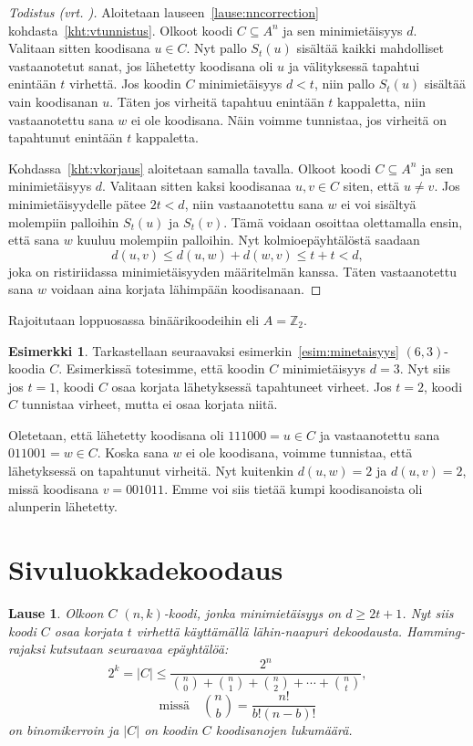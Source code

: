 \documentclass[a4paper,12pt,leqno,oneside]{report} %
\theoremstyle{plain}
\newtheorem{lause}{Lause}[chapter]
\theoremstyle{plain}
\theoremstyle{definition}
\newtheorem{esimerkki}{Esimerkki}[chapter]
\theoremstyle{remark}
\numberwithin{equation}{chapter}
\newcommand*{\Zset}{\mathbb{Z}}  %
\newcommand*{\abs}[1]{\left\lvert#1\right\rvert}   %
\begin{document}
    \begin{proof}[Todistus \upshape(vrt. {\cite[s.~494]{PA}})]\label{tod:nncorrection}
        Aloitetaan lauseen~\ref{lause:nncorrection} kohdasta~\ref{kht:vtunnistus}. Olkoot koodi $C \subseteq A^n$ ja sen minimietäisyys $d$. Valitaan sitten koodisana $u \in C$. Nyt pallo $S_t(u)$ sisältää kaikki mahdolliset vastaanotetut sanat, jos lähetetty koodisana oli $u$ ja välityksessä tapahtui enintään $t$ virhettä. Jos koodin $C$ minimietäisyys $d < t$, niin pallo $S_t(u)$ sisältää vain koodisanan $u$. Täten jos virheitä tapahtuu enintään $t$ kappaletta, niin vastaanotettu sana $w$ ei ole koodisana. Näin voimme tunnistaa, jos virheitä on tapahtunut enintään $t$ kappaletta.

        Kohdassa~\ref{kht:vkorjaus} aloitetaan samalla tavalla. Olkoot koodi $C \subseteq A^n$ ja sen minimietäisyys $d$. Valitaan sitten kaksi koodisanaa $u, v \in C$ siten, että $u \neq v$. Jos minimietäisyydelle pätee $2t < d$, niin vastaanotettu sana $w$ ei voi sisältyä molempiin palloihin $S_t(u)$ ja $S_t(v)$. Tämä voidaan osoittaa olettamalla ensin, että sana $w$ kuuluu molempiin palloihin. Nyt kolmioepäyhtälöstä saadaan
        \[
            d(u,v) \le d(u,w) + d(w, v) \le t + t < d,
        \]
        joka on ristiriidassa minimietäisyyden määritelmän kanssa. Täten vastaanotettu sana $w$ voidaan aina korjata lähimpään koodisanaan.
    \end{proof}

    Rajoitutaan loppuosassa binäärikoodeihin eli $A = \Zset_2$.
    \begin{esimerkki}
        Tarkastellaan seuraavaksi esimerkin~\ref{esim:minetaisyys} $(6,3)$-koodia $C$. Esimerkissä totesimme, että koodin $C$ minimietäisyys $d = 3$. Nyt siis jos $t = 1$, koodi $C$ osaa korjata lähetyksessä tapahtuneet virheet. Jos $t = 2$, koodi $C$ tunnistaa virheet, mutta ei osaa korjata niitä.

        Oletetaan, että lähetetty koodisana oli $111000 = u \in C$ ja vastaanotettu sana $011001= w \in C$. Koska sana $w$ ei ole koodisana, voimme tunnistaa, että lähetyksessä on tapahtunut virheitä. Nyt kuitenkin $d(u,w) = 2$ ja $d(u,v) = 2$, missä koodisana $v = 001011$. Emme voi siis tietää kumpi koodisanoista oli alunperin lähetetty.
    \end{esimerkki}

    \section{Sivuluokkadekoodaus}
    \begin{lause}\label{lause:Hammingraja}
        Olkoon $C$ $(n, k)$-koodi, jonka minimietäisyys on $d \ge 2t +1$. Nyt siis koodi $C$ osaa korjata $t$ virhettä käyttämällä lähin-naapuri dekoodausta. Hamming-rajaksi kutsutaan seuraavaa epäyhtälöä:
        \[
            2^k = \abs{C} \le \frac{2^n}{\binom{n}{0}+\binom{n}{1}+\binom{n}{2}+\cdots+\binom{n}{t}},
        \]
        \[
            \text{missä} \quad \binom{n}{b} = \frac{n!}{b!(n-b)!}
        \]
        on binomikerroin ja $\abs{C}$ on koodin $C$ koodisanojen lukumäärä.
    \end{lause}
\end{document}
